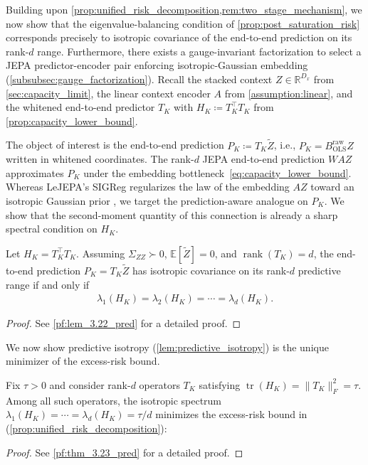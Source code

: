 Building upon \cref{prop:unified_risk_decomposition,rem:two_stage_mechanism}, we now show that the eigenvalue-balancing condition of \cref{prop:post_saturation_risk} corresponds precisely to isotropic covariance of the end-to-end prediction on its rank-$d$ range.
Furthermore, there exists a gauge-invariant factorization to select a JEPA predictor-encoder pair enforcing isotropic-Gaussian embedding (\cref{subsubsec:gauge_factorization}).
Recall the stacked context $Z\in\mathbb R^{D_x}$ from \cref{sec:capacity_limit}, the 
linear context encoder $A$ from \cref{assumption:linear}, and the whitened end-to-end predictor $T_K$ with $H_K\coloneqq T_K^\top T_K$ from \cref{prop:capacity_lower_bound}. 

The object of interest is the end-to-end prediction $P_K \coloneqq T_K \widetilde Z$, i.e., $P_K = B_{\mathrm{OLS}}^{\mathrm{raw}} Z$ written in whitened coordinates.
The rank-$d$ JEPA end-to-end prediction $WAZ$ approximates $P_K$ under the embedding bottleneck~\eqref{eq:capacity_lower_bound}. 
Whereas LeJEPA's SIGReg regularizes the law of the embedding $AZ$ toward an isotropic Gaussian prior \citep{balestriero2025lejepa}, we target the prediction-aware analogue on $P_K$.
We show that the second-moment quantity of this connection is already a sharp spectral condition on $H_K$.
\begin{lemma}
\label{lem:predictive_isotropy}
Let $H_K=T_K^\top T_K$. Assuming $\Sigma_{ZZ}\succ 0$, $\mathbb E[\widetilde Z]=0$, and $\operatorname{rank}(T_K)=d$, the end-to-end prediction $P_K=T_K\widetilde Z$ has isotropic covariance on its rank-$d$ predictive range if and only if
\begin{align}
\label{eq:pred_cov_isotropy}
\lambda_1(H_K)=\lambda_2(H_K)=\cdots=\lambda_d(H_K).
\end{align}
\end{lemma}
\begin{proof}
    See \cref{pf:lem_3.22_pred} for a detailed proof.
\end{proof}


We now show predictive isotropy (\cref{lem:predictive_isotropy}) is the unique minimizer of the excess-risk bound.


\begin{theorem}
\label{thm:predictive_isotropy_opt}
Fix $\tau>0$ and consider rank-$d$ operators $T_K$ satisfying
$\operatorname{tr}(H_K)=\|T_K\|_F^2=\tau.$
Among all such operators, the isotropic spectrum
$\lambda_1(H_K)=\cdots=\lambda_d(H_K)=\tau/d$ minimizes the excess-risk bound in (\cref{prop:unified_risk_decomposition}):
\end{theorem}
\begin{proof}
See \cref{pf:thm_3.23_pred} for a detailed proof.
\end{proof}




